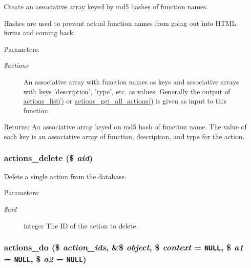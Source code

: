 Create an associative array keyed by md5 hashes of function names.

Hashes are used to prevent actual function names from going out into HTML forms and coming back.

\begin{Desc}
\item[Parameters:]
\begin{description}
\item[{\em \$actions}]An associative array with function names as keys and associative arrays with keys 'description', 'type', etc. as values. Generally the output of \hyperlink{actions_8inc_d0dbf276d4ca1834760cffc7e1b1be53}{actions\_\-list()} or \hyperlink{actions_8inc_4275e9fee609ba6e85b03278a681436c}{actions\_\-get\_\-all\_\-actions()} is given as input to this function.\end{description}
\end{Desc}
\begin{Desc}
\item[Returns:]An associative array keyed on md5 hash of function name. The value of each key is an associative array of function, description, and type for the action. \end{Desc}
\hypertarget{actions_8inc_857468911c3dd6f839cbdb14c6ed80ac}{
\subsubsection[{actions\_\-delete}]{\setlength{\rightskip}{0pt plus 5cm}actions\_\-delete (\$ {\em aid})}}
\label{actions_8inc_857468911c3dd6f839cbdb14c6ed80ac}


Delete a single action from the database.

\begin{Desc}
\item[Parameters:]
\begin{description}
\item[{\em \$aid}]integer The ID of the action to delete. \end{description}
\end{Desc}
\hypertarget{actions_8inc_7da5f346de3d54e5b0cee717a6f2d390}{
\subsubsection[{actions\_\-do}]{\setlength{\rightskip}{0pt plus 5cm}actions\_\-do (\$ {\em action\_\-ids}, \/  \&\$ {\em object}, \/  \$ {\em context} = {\tt NULL}, \/  \$ {\em a1} = {\tt NULL}, \/  \$ {\em a2} = {\tt NULL})}}
\label{actions_8inc_7da5f346de3d54e5b0cee717a6f2d390}


